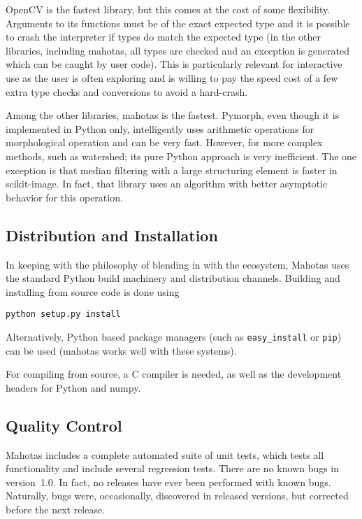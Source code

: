 \documentclass{scrartcl}
\newcommand*{\cpp}{{C\nolinebreak[4]\hspace{-.05em}\raisebox{.4ex}{\tiny\textbf{++}}}}
\begin{document}
OpenCV is the fastest library, but this comes at the cost of some flexibility.
Arguments to its functions must be of the exact expected type and it is
possible to crash the interpreter if types do match the expected type (in the
other libraries, including mahotas, all types are checked and an exception is
generated which can be caught by user code). This is particularly relevant for
interactive use as the user is often exploring and is willing to pay the speed
cost of a few extra type checks and conversions to avoid a hard-crash.

Among the other libraries, mahotas is the fastest. Pymorph, even though it is
implemented in Python only, intelligently uses arithmetic operations for
morphological operation and can be very fast. However, for more complex
methods, such as watershed; its pure Python approach is very inefficient. The
one exception is that median filtering with a large structuring element is
faster in scikit-image. In fact, that library uses an algorithm with better
asymptotic behavior for this operation.

\subsection{Distribution and Installation}

In keeping with the philosophy of blending in with the ecosystem, Mahotas uses
the standard Python build machinery and distribution channels. Building and
installing from source code is done using
\begin{verbatim}
python setup.py install
\end{verbatim}
Alternatively, Python based package managers (such as \texttt{easy\_install} or
\texttt{pip}) can be used (mahotas works well with these systems).

For compiling from source, a \cpp{} compiler is needed, as well as the
development headers for Python and numpy.

\subsection{Quality Control}

Mahotas includes a complete automated suite of unit tests, which tests all
functionality and include several regression tests. There are no known bugs in
version~1.0. In fact, no releases have ever been performed with known bugs.
Naturally, bugs were, occasionally, discovered in released versions, but
corrected before the next release.
\end{document}
